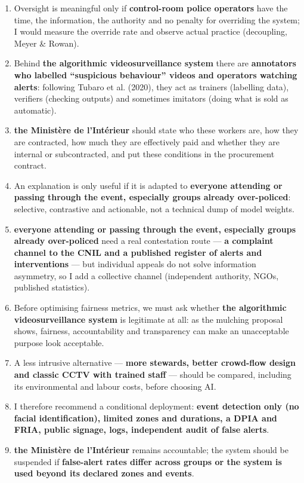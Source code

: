 \documentclass[11pt,a4paper]{article}
\begin{document}
\begin{enumerate}[leftmargin=1.6em]
\item Oversight is meaningful only if \textcolor{tipc}{\textbf{control-room police operators}} have the time, the information, the authority and no penalty for overriding the system; I would measure the override rate and observe actual practice (decoupling, Meyer \& Rowan).
\item Behind \textcolor{tipc}{\textbf{the algorithmic videosurveillance system}} there are \textcolor{tipc}{\textbf{annotators who labelled “suspicious behaviour” videos and operators watching alerts}}: following Tubaro et al. (2020), they act as trainers (labelling data), verifiers (checking outputs) and sometimes imitators (doing what is sold as automatic).
\item \textcolor{tipc}{\textbf{the Ministère de l’Intérieur}} should state who these workers are, how they are contracted, how much they are effectively paid and whether they are internal or subcontracted, and put these conditions in the procurement contract.
\item An explanation is only useful if it is adapted to \textcolor{tipc}{\textbf{everyone attending or passing through the event, especially groups already over-policed}}: selective, contrastive and actionable, not a technical dump of model weights.
\item \textcolor{tipc}{\textbf{everyone attending or passing through the event, especially groups already over-policed}} need a real contestation route — \textcolor{tipc}{\textbf{a complaint channel to the CNIL and a published register of alerts and interventions}} — but individual appeals do not solve information asymmetry, so I add a collective channel (independent authority, NGOs, published statistics).
\item Before optimising fairness metrics, we must ask whether \textcolor{tipc}{\textbf{the algorithmic videosurveillance system}} is legitimate at all: as the mulching proposal shows, fairness, accountability and transparency can make an unacceptable purpose look acceptable.
\item A less intrusive alternative — \textcolor{tipc}{\textbf{more stewards, better crowd-flow design and classic CCTV with trained staff}} — should be compared, including its environmental and labour costs, before choosing AI.
\item I therefore recommend a conditional deployment: \textcolor{tipc}{\textbf{event detection only (no facial identification), limited zones and durations, a DPIA and FRIA, public signage, logs, independent audit of false alerts}}.
\item \textcolor{tipc}{\textbf{the Ministère de l’Intérieur}} remains accountable; the system should be suspended if \textcolor{tipc}{\textbf{false-alert rates differ across groups or the system is used beyond its declared zones and events}}.
\end{enumerate}
\end{document}
